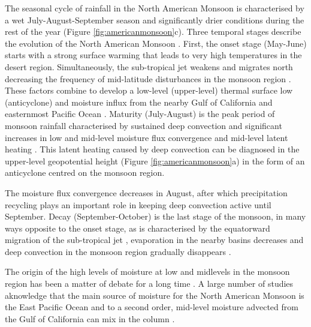  The seasonal cycle of rainfall in the North American Monsoon is characterised by a wet July-August-September season and significantly drier conditions during the rest of the year \citep{adams1997} (Figure \ref{fig:americanmonsoon}c).
Three temporal stages describe the evolution of the North American Monsoon \citep{adams1997,geil2013}.
First, the onset stage (May-June) starts with a strong surface warming that leads to very high temperatures in the desert region.
Simultaneously, the sub-tropical jet weakens and migrates north decreasing the frequency of mid-latitude disturbances in the monsoon region \citep{douglas1993,turrent2009}.
These factors combine to develop a low-level (upper-level) thermal surface low (anticyclone) and  moisture influx from the nearby Gulf of California and easternmost Pacific Ocean \citep{douglas1993,geil2013}.
Maturity (July-August) is the peak period of monsoon rainfall characterised by sustained deep convection \citep{barlow1998} and significant increases in low and mid-level moisture flux convergence and mid-level latent heating \citep{adams1997,cook2013}. This latent heating caused by deep convection can be diagnosed in the upper-level geopotential height (Figure \ref{fig:americanmonsoon}a) in the form of an anticyclone centred on the monsoon region. 

The moisture flux convergence decreases in August, after which precipitation recycling \citep{dominguez2008} plays an important role in keeping deep convection active until September.
 Decay (September-October) is the last stage of the monsoon, in many ways opposite to the onset stage, as is characterised by the equatorward migration of the sub-tropical jet \citep{higgins1997,geil2013}, evaporation in the nearby basins decreases and deep convection in the monsoon region gradually disappears \citep{douglas1993}.

 The origin of the high levels of moisture at low and midlevels in the monsoon region has been a matter of debate for a long time \citep{adams1997,barlow1998,vera2006,ordonez2019}.
A large number of studies aknowledge that the main source of moisture for the North American Monsoon is the East Pacific Ocean and to a second order, mid-level moisture advected from the Gulf of California can mix in the column \citep[e.g.][]{adams1997,stensrud1997,vera2006,turrent2009,ordonez2019}.


